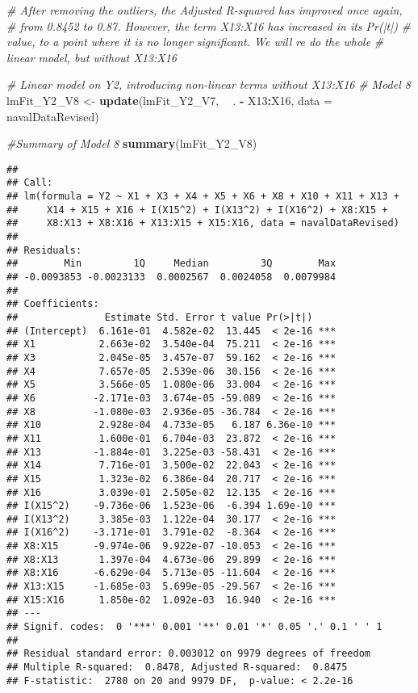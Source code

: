 \documentclass[
]{article}
\newenvironment{Shaded}{\begin{snugshade}}{\end{snugshade}}
\newcommand{\CommentTok}[1]{\textcolor[rgb]{0.56,0.35,0.01}{\textit{#1}}}
\newcommand{\DataTypeTok}[1]{\textcolor[rgb]{0.13,0.29,0.53}{#1}}
\newcommand{\KeywordTok}[1]{\textcolor[rgb]{0.13,0.29,0.53}{\textbf{#1}}}
\newcommand{\NormalTok}[1]{#1}
\newcommand{\OperatorTok}[1]{\textcolor[rgb]{0.81,0.36,0.00}{\textbf{#1}}}
\newcommand{\StringTok}[1]{\textcolor[rgb]{0.31,0.60,0.02}{#1}}
\begin{document}
\begin{Shaded}
\begin{Highlighting}[]
\CommentTok{# After removing the outliers, the Adjusted R-squared has improved once again,}
\CommentTok{# from 0.8452 to 0.87. However, the term X13:X16 has increased in its Pr(|t|)}
\CommentTok{# value, to a point where it is no longer significant. We will re do the whole}
\CommentTok{# linear model, but without X13:X16}

\CommentTok{# Linear model on Y2, introducing non-linear terms without X13:X16}
\CommentTok{# Model 8}
\NormalTok{lmFit_Y2_V8 <-}\StringTok{ }\KeywordTok{update}\NormalTok{(lmFit_Y2_V7, }\OperatorTok{~}\StringTok{ }\NormalTok{. }\OperatorTok{-}\StringTok{ }\NormalTok{X13}\OperatorTok{:}\NormalTok{X16, }\DataTypeTok{data =}\NormalTok{ navalDataRevised)}

\CommentTok{#Summary of Model 8}
\KeywordTok{summary}\NormalTok{(lmFit_Y2_V8)}
\end{Highlighting}
\end{Shaded}

\begin{verbatim}
## 
## Call:
## lm(formula = Y2 ~ X1 + X3 + X4 + X5 + X6 + X8 + X10 + X11 + X13 + 
##     X14 + X15 + X16 + I(X15^2) + I(X13^2) + I(X16^2) + X8:X15 + 
##     X8:X13 + X8:X16 + X13:X15 + X15:X16, data = navalDataRevised)
## 
## Residuals:
##        Min         1Q     Median         3Q        Max 
## -0.0093853 -0.0023133  0.0002567  0.0024058  0.0079984 
## 
## Coefficients:
##               Estimate Std. Error t value Pr(>|t|)    
## (Intercept)  6.161e-01  4.582e-02  13.445  < 2e-16 ***
## X1           2.663e-02  3.540e-04  75.211  < 2e-16 ***
## X3           2.045e-05  3.457e-07  59.162  < 2e-16 ***
## X4           7.657e-05  2.539e-06  30.156  < 2e-16 ***
## X5           3.566e-05  1.080e-06  33.004  < 2e-16 ***
## X6          -2.171e-03  3.674e-05 -59.089  < 2e-16 ***
## X8          -1.080e-03  2.936e-05 -36.784  < 2e-16 ***
## X10          2.928e-04  4.733e-05   6.187 6.36e-10 ***
## X11          1.600e-01  6.704e-03  23.872  < 2e-16 ***
## X13         -1.884e-01  3.225e-03 -58.431  < 2e-16 ***
## X14          7.716e-01  3.500e-02  22.043  < 2e-16 ***
## X15          1.323e-02  6.386e-04  20.717  < 2e-16 ***
## X16          3.039e-01  2.505e-02  12.135  < 2e-16 ***
## I(X15^2)    -9.736e-06  1.523e-06  -6.394 1.69e-10 ***
## I(X13^2)     3.385e-03  1.122e-04  30.177  < 2e-16 ***
## I(X16^2)    -3.171e-01  3.791e-02  -8.364  < 2e-16 ***
## X8:X15      -9.974e-06  9.922e-07 -10.053  < 2e-16 ***
## X8:X13       1.397e-04  4.673e-06  29.899  < 2e-16 ***
## X8:X16      -6.629e-04  5.713e-05 -11.604  < 2e-16 ***
## X13:X15     -1.685e-03  5.699e-05 -29.567  < 2e-16 ***
## X15:X16      1.850e-02  1.092e-03  16.940  < 2e-16 ***
## ---
## Signif. codes:  0 '***' 0.001 '**' 0.01 '*' 0.05 '.' 0.1 ' ' 1
## 
## Residual standard error: 0.003012 on 9979 degrees of freedom
## Multiple R-squared:  0.8478, Adjusted R-squared:  0.8475 
## F-statistic:  2780 on 20 and 9979 DF,  p-value: < 2.2e-16
\end{verbatim}
\end{document}

